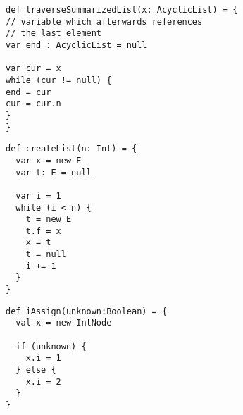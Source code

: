 \documentclass[11pt,a4paper,english]{article}
\begin{document}
\thispagestyle{empty}

\begin{minipage}{.6\linewidth}%
\begin{lstlisting}[caption={List traversal testcase},label={lst:traverseList}]
def traverseSummarizedList(x: AcyclicList) = {
// variable which afterwards references 
// the last element
var end : AcyclicList = null

var cur = x
while (cur != null) {
end = cur
cur = cur.n
} 	  
}
\end{lstlisting}
\end{minipage}





\begin{minipage}{.33\linewidth}%
\begin{lstlisting}[caption={List traversal testcase},label={prepend}]
def createList(n: Int) = {
  var x = new E
  var t: E = null
  
  var i = 1
  while (i < n) {
    t = new E
    t.f = x
    x = t
    t = null
    i += 1
  }
}
\end{lstlisting}
\end{minipage}


  


\begin{minipage}{.4\linewidth}%
\begin{lstlisting}[caption={wbla},label={cond}]
def iAssign(unknown:Boolean) = {
  val x = new IntNode
  
  if (unknown) {
    x.i = 1
  } else {
    x.i = 2
  }
}
\end{lstlisting}
\end{minipage}
\end{document}
